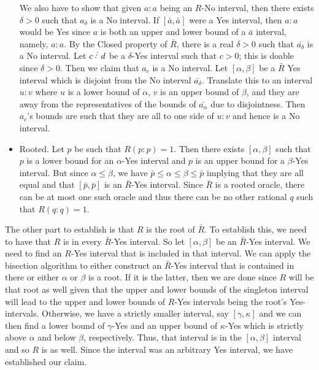 \documentclass[12pt]{article}
\begin{document}
\begin{itemize}
    We also have to show that given $a:a$ being an $R$-No interval, then there exists $\delta>0$ such that $a_\delta$ is a No interval. If $[\bar{a},\bar{a}]$ were a Yes interval, then $a:a$ would be Yes since $a$ is both an upper and lower bound of a $\bar{a}$ interval, namely, $a:a$. By the Closed property of $\bar{R}$, there is a real $\delta > 0$ such that $\bar{a_\delta}$ is a No interval. Let $c\lte d$ be a $\delta$-Yes interval such that $c > 0$; this is doable since $\delta >0$. Then we claim that $a_c$ is a No interval. Let $[\alpha, \beta]$ be a $\bar{R}$ Yes interval which is disjoint from the No interval $\bar{a_\delta}$. Translate this to an interval $u:v$ where $u$ is a lower bound of $\alpha$, $v$ is an upper bound of $\beta$, and they are away from the representatives of the bounds of $\bar{a_\alpha}$ due to disjointness. Then $a_c$'s bounds are such that they are all to one side of $u:v$ and hence is a No interval. 
    
    
    \item Rooted. Let $p$ be such that $R(p:p)=1$. Then there exists $[\alpha, \beta]$ such that $p$ is a lower bound for an $\alpha$-Yes interval and $p$ is an upper bound for a $\beta$-Yes interval. But since $\alpha \leq \beta$, we have $\bar{p} \leq \alpha \leq \beta \leq \bar{p}$ implying that they are all equal and that $[\bar{p}, \bar{p}]$ is an $\bar{R}$-Yes interval. Since $\bar{R}$ is a rooted oracle, there can be at most one such oracle and thus there can be no other rational $q$ such that $R(q:q) = 1$.

\end{itemize}

The other part to establish is that $R$ is the root of $\bar{R}$. To establish this, we need to have that $R$ is in every $\bar{R}$-Yes interval. So let $[\alpha, \beta]$ be an $\bar{R}$-Yes interval. We need to find an $R$-Yes interval that is included in that interval. We can apply the bisection algorithm to either construct an $\bar{R}$-Yes interval that is contained in there or either $\alpha$ or $\beta$ is a root. If it is the latter, then we are done since $R$ will be that root as well given that the upper and lower bounds of the singleton interval will lead to the upper and lower bounds of $R$-Yes intervals being the root's Yes-intervals. Otherwise, we have a strictly smaller interval, say $[\gamma, \kappa]$ and we can then find a lower bound of $\gamma$-Yes and an upper bound of $\kappa$-Yes which is strictly above $\alpha$ and below $\beta$, respectively. Thus, that interval is in the $[\alpha, \beta]$ interval and so $R$ is as well. Since the interval was an arbitrary Yes interval, we have established our claim. 
\end{document}
